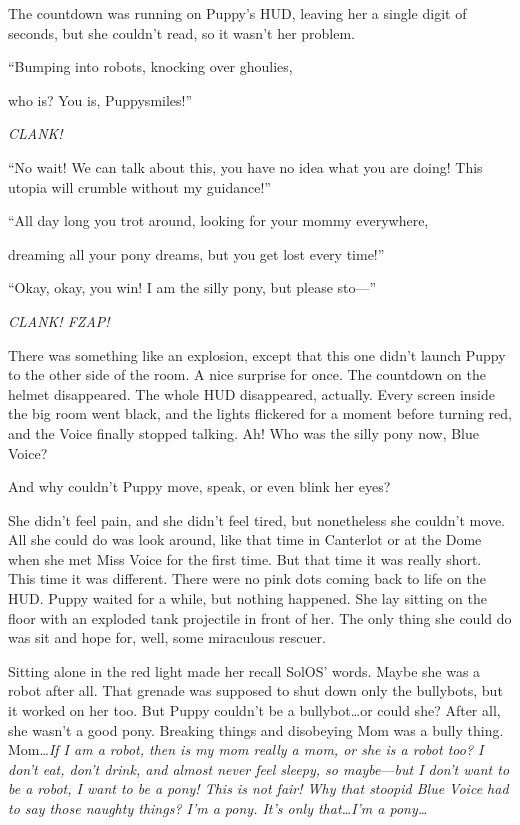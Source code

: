The countdown was running on Puppy's HUD, leaving her a single digit of seconds, but she couldn't read, so it wasn't her problem.

\begin{song}
	``Bumping into robots, knocking over ghoulies,

	who is? You is, Puppysmiles!''
\end{song}

\emph{CLANK!}

``No wait! We can talk about this, you have no idea what you are doing! This utopia will crumble without my guidance!''

\begin{song}
	``All day long you trot around, looking for your mommy everywhere,

	dreaming all your pony dreams, but you get lost every time!''
\end{song}

``Okay, okay, you win! I am the silly pony, but please sto---''

\emph{CLANK! FZAP!}

There was something like an explosion, except that this one didn't launch Puppy to the other side of the room. A nice surprise for once. The countdown on the helmet disappeared. The whole HUD disappeared, actually. Every screen inside the big room went black, and the lights flickered for a moment before turning red, and the Voice finally stopped talking. Ah! Who was the silly pony now, Blue Voice?

And why couldn't Puppy move, speak, or even blink her eyes?

She didn't feel pain, and she didn't feel tired, but nonetheless she couldn't move. All she could do was look around, like that time in Canterlot or at the Dome when she met Miss Voice for the first time. But that time it was really short. This time it was different. There were no pink dots coming back to life on the HUD. Puppy waited for a while, but nothing happened. She lay sitting on the floor with an exploded tank projectile in front of her. The only thing she could do was sit and hope for, well, some miraculous rescuer.

Sitting alone in the red light made her recall SolOS' words. Maybe she was a robot after all. That grenade was supposed to shut down only the bullybots, but it worked on her too. But Puppy couldn't be a bullybot\dots or could she? After all, she wasn't a good pony. Breaking things and disobeying Mom was a bully thing. Mom\dots \emph{If I am a robot, then is my mom really a mom, or she is a robot too? I don't eat, don't drink, and almost never feel sleepy, so maybe}---\emph{but I don't want to be a robot, I want to be a pony! This is not fair! Why that stoopid Blue Voice had to say those naughty things? I'm a pony. It's only that\dots I'm a pony\dots}

